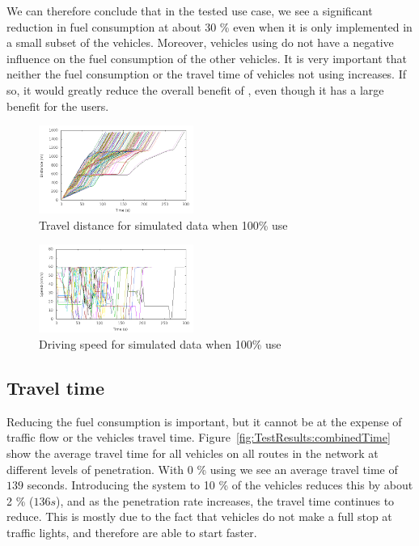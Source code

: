 We can therefore conclude that in the tested use case, we see a significant reduction in fuel consumption at about 30 \% even when it is only implemented in a small subset of the vehicles.
Moreover, vehicles using \tech do not have a negative influence on the fuel consumption of the other vehicles.
It is very important that neither the fuel consumption or the travel time of vehicles not using \tech increases.
If so, it would greatly reduce the overall benefit of \tech, even though it has a large benefit for the users.

\begin{figure}[htb]
\includegraphics[width=0.45\textwidth]{../images/tp0c0_8/distanceControlled100.png}
\caption{Travel distance for simulated data when 100\% use \tech}
\label{fig:TestResults:distance100}
\end{figure}

\begin{figure}[htb]
\includegraphics[width=0.45\textwidth]{../images/tp0c0_8/speedControlled100.png}
\caption{Driving speed for simulated data when 100\% use \tech}
\label{fig:TestResults:speed100}
\end{figure}

\subsection{Travel time}
Reducing the fuel consumption is important, but it cannot be at the expense of traffic flow or the vehicles travel time.
Figure~\ref{fig:TestResults:combinedTime} show the average travel time for all vehicles on all routes in the network at different levels of penetration.
With 0 \% using \tech we see an average travel time of $139$ seconds. 
Introducing the system to 10 \% of the vehicles reduces this by about 2 \% ($136s$), and as the penetration rate increases, the travel time continues to reduce. 
This is mostly due to the fact that vehicles do not make a full stop at traffic lights, and therefore are able to start faster.

